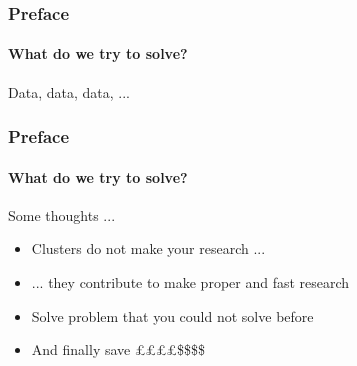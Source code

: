 \documentclass{beamer}
\begin{document}
\begin{frame}
  \frametitle{Preface}
  \framesubtitle{What do we try to solve?}
  \begin{block}{Data, data, data, ...}\footnotesize
    \begin{figure}
      \centering
    \end{figure}
  \end{block}
\end{frame}

\begin{frame}
  \frametitle{Preface}
  \framesubtitle{What do we try to solve?}
  \begin{block}{Some thoughts ...}\footnotesize
    \begin{itemize}
    \item<1-> Clusters do not make your research ...
    \item<2-> ... they contribute to make proper and fast research
    \item<3-> Solve problem that you could not solve before
    \item<4-> And finally save ££££\$\$\$\$
    \end{itemize}
  \end{block}
\end{frame}
\end{document}
